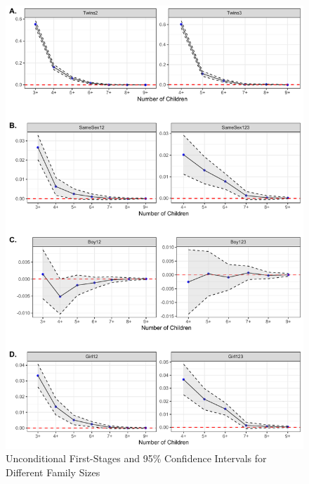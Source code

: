 \documentclass[11pt,a4paper]{article}
\begin{document}
\begin{figure}[h!]
\centering
\caption{\label{fig:02}Unconditional First-Stages and 95\% Confidence Intervals for Different Family Sizes}
\includegraphics[width=\textwidth]{figures/acrs.pdf}
\end{figure}
\end{document}
